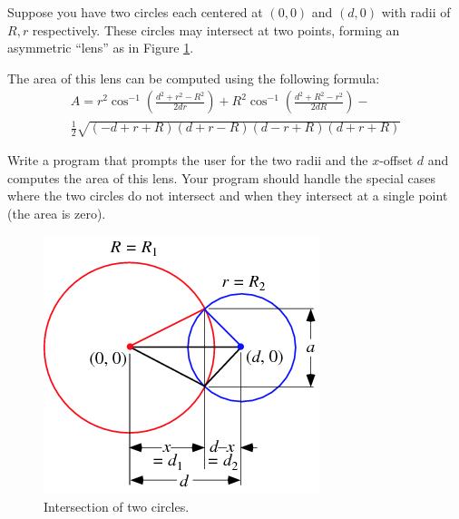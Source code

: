 \begin{exer}
Suppose you have two circles each centered at $(0,0)$ and $(d,0)$
with radii of $R, r$ respectively.  These circles may intersect at two points, 
forming an asymmetric ``lens'' as in Figure \ref{fig:circleIntersection}.

The area of this lens can be computed using the following formula:
\begin{gather*}
A = r^2 \cos^{-1}{\left(\frac{d^2+r^2-R^2}{2dr}\right)} + R^2\cos^{-1}{\left(\frac{d^2+R^2-r^2}{2dR}\right)} - \\
\frac{1}{2}\sqrt{(-d+r+R)(d+r-R)(d-r+R)(d+r+R)}
\end{gather*}

Write a program that prompts the user for the two radii and the $x$-offset $d$
and computes the area of this lens.  Your program should handle the special cases 
where the two circles do not intersect and when they intersect at a single point 
(the area is zero).


\begin{figure}[h]
\centering
\includegraphics[scale=0.50]{images/circleIntersection}
\caption{Intersection of two circles.}
\label{fig:circleIntersection}
\end{figure}
\end{exer}



